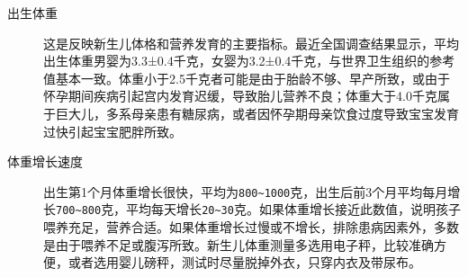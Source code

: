 \begin{description}
\item[出生体重] 这是反映新生儿体格和营养发育的主要指标。最近全国调查结果显示，平均出生体重男婴为3.3±0.4千克，女婴为3.2±0.4千克，与世界卫生组织的参考值基本一致。体重小于2.5千克者可能是由于胎龄不够、早产所致，或由于怀孕期间疾病引起宫内发育迟缓，导致胎儿营养不良；体重大于4.0千克属于巨大儿，多系母亲患有糖尿病，或者因怀孕期母亲饮食过度导致宝宝发育过快引起宝宝肥胖所致。

\item[体重增长速度] 出生第1个月体重增长很快，平均为\texttt{800\textasciitilde{}1000}\hspace{0pt}克，出生后前3个月平均每月增长\texttt{700\textasciitilde{}800}\hspace{0pt}克，平均每天增长\texttt{20\textasciitilde{}30}\hspace{0pt}克。如果体重增长接近此数值，说明孩子喂养充足，营养合适。如果体重增长过慢或不增长，排除患病因素外，多数是由于喂养不足或腹泻所致。新生儿体重测量多选用电子秤，比较准确方便，或者选用婴儿磅秤，测试时尽量脱掉外衣，只穿内衣及带尿布。
\end{description}


